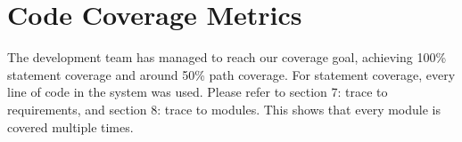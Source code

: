 \documentclass[12pt, titlepage]{article}
\begin{document}
\section{Code Coverage Metrics}

The development team has managed to reach our coverage goal, achieving 100\% statement coverage and around 50\% path coverage. For statement coverage, every line of code in the system was used. Please refer to section 7: trace to requirements, and section 8: trace to modules. This shows that every module is covered multiple times.




\end{document}
